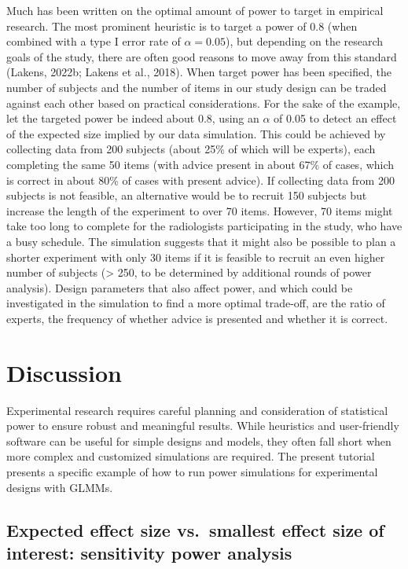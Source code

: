 \documentclass[
  man,floatsintext]{apa6}
\begin{document}
Much has been written on the optimal amount of power to target in empirical research. The most prominent heuristic is to target a power of 0.8 (when combined with a type I error rate of \(\alpha = 0.05\)), but depending on the research goals of the study, there are often good reasons to move away from this standard (Lakens, 2022b; Lakens et al., 2018). When target power has been specified, the number of subjects and the number of items in our study design can be traded against each other based on practical considerations. For the sake of the example, let the targeted power be indeed about 0.8, using an \(\alpha\) of 0.05 to detect an effect of the expected size implied by our data simulation. This could be achieved by collecting data from 200 subjects (about 25\% of which will be experts), each completing the same 50 items (with advice present in about 67\% of cases, which is correct in about 80\% of cases with present advice). If collecting data from 200 subjects is not feasible, an alternative would be to recruit 150 subjects but increase the length of the experiment to over 70 items. However, 70 items might take too long to complete for the radiologists participating in the study, who have a busy schedule. The simulation suggests that it might also be possible to plan a shorter experiment with only 30 items if it is feasible to recruit an even higher number of subjects (\textgreater{} 250, to be determined by additional rounds of power analysis). Design parameters that also affect power, and which could be investigated in the simulation to find a more optimal trade-off, are the ratio of experts, the frequency of whether advice is presented and whether it is correct.

\hypertarget{discussion}{%
\section{Discussion}\label{discussion}}

Experimental research requires careful planning and consideration of statistical power to ensure robust and meaningful results. While heuristics and user-friendly software can be useful for simple designs and models, they often fall short when more complex and customized simulations are required. The present tutorial presents a specific example of how to run power simulations for experimental designs with GLMMs.

\hypertarget{expected-effect-size-vs.-smallest-effect-size-of-interest-sensitivity-power-analysis}{%
\subsection{Expected effect size vs.~smallest effect size of interest: sensitivity power analysis}\label{expected-effect-size-vs.-smallest-effect-size-of-interest-sensitivity-power-analysis}}
\end{document}
